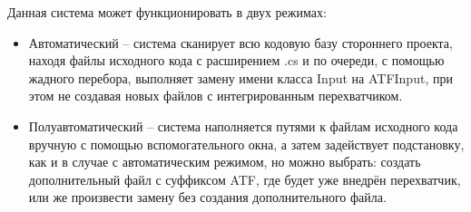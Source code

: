 Данная система может функционировать в двух режимах:
\begin{itemize}
	\item Автоматический -- система сканирует всю кодовую базу стороннего проекта, находя файлы исходного кода с расширением .cs и по очереди, с помощью жадного перебора, выполняет замену имени класса Input на ATFInput, при этом не создавая новых файлов с интегрированным перехватчиком.
	\item Полуавтоматический -- система наполняется путями к файлам исходного кода вручную с помощью вспомогательного окна, а затем задействует подстановку, как и в случае с автоматическим режимом, но можно выбрать: создать дополнительный файл с суффиксом ATF, где будет уже внедрён перехватчик, или же произвести замену без создания дополнительного файла.
\end{itemize}